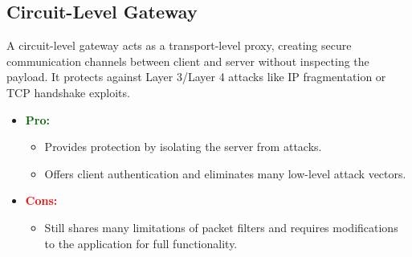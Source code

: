 \subsection{Circuit-Level Gateway}
A circuit-level gateway acts as a transport-level proxy, creating secure communication channels between client and server without inspecting the payload. It protects against Layer 3/Layer 4 attacks like IP fragmentation or TCP handshake exploits.
\begin{itemize}
    \item \textcolor{darkgreen}{\textbf{Pro:}} 
    \begin{itemize}
        \item Provides protection by isolating the server from attacks.
        \item Offers client authentication and eliminates many low-level attack vectors.
    \end{itemize}
    \item \textcolor{red}{\textbf{Cons:}} 
    \begin{itemize}
        \item Still shares many limitations of packet filters and requires modifications to the application for full functionality.
    \end{itemize}
\end{itemize}

